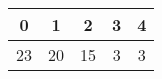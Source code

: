 \begin{tabular}{|c|c|c|c|c|}
    \hline
    \rule{0pt}{4ex} 0 & 1 & 2 & 3 & 4\\
    \hline
    23 & 20 & 15 & 3 & 3\\
    \hline
    [1ex]
\end{tabular}